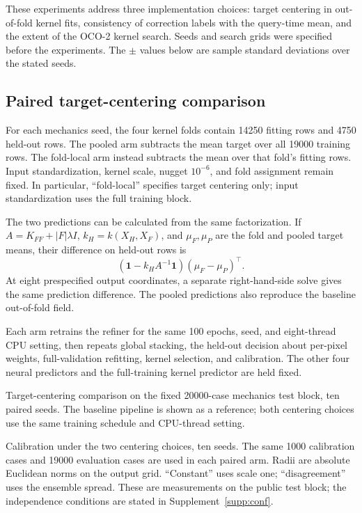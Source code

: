 These experiments address three implementation choices:
target centering in out-of-fold kernel fits,
consistency of correction labels with the query-time mean, and the extent
of the OCO-2 kernel search. Seeds and search grids were specified before the experiments. The $\pm$ values below
are sample standard deviations over the stated seeds.

\subsection{Paired target-centering comparison}
For each mechanics seed, the four kernel folds contain 14250 fitting rows
and 4750 held-out rows. The pooled arm subtracts the mean target over all
19000 training rows. The fold-local arm instead subtracts the mean over
that fold's fitting rows. Input standardization, kernel scale, nugget
$10^{-6}$, and fold assignment remain fixed. In particular, ``fold-local''
specifies target centering only; input standardization uses the full
training block.

The two predictions can be calculated from the same factorization. If
$A=K_{FF}+|F|\lambda I$, $k_H=k(X_H,X_F)$, and $\mu_F,\mu_P$ are the
fold and pooled target means, their difference on held-out rows is
\[
 (\mathbf 1-k_HA^{-1}\mathbf 1)(\mu_F-\mu_P)^\top.
\]
At eight prespecified output coordinates, a separate right-hand-side
solve gives the same prediction difference. The pooled predictions also
reproduce the baseline out-of-fold field.

Each arm retrains the refiner for the same 100 epochs, seed, and eight-thread
CPU setting, then repeats global stacking, the held-out decision about
per-pixel weights, full-validation refitting, kernel selection, and
calibration. The other four neural predictors and the full-training kernel
predictor are held fixed.

\begin{table}[t]
\centering
\caption{Target-centering comparison on the fixed 20000-case mechanics test
block, ten paired seeds. The baseline pipeline is shown as a reference;
both centering choices use the same training schedule and CPU-thread setting.}
\label{tab:centering-sensitivity}
\begin{adjustbox}{max width=\linewidth}

\end{adjustbox}
\end{table}

\begin{table}[t]
\centering
\caption{Calibration under the two centering choices, ten seeds. The same 1000
calibration cases and 19000 evaluation cases are used in each paired arm.
Radii are absolute Euclidean norms on the output grid. ``Constant'' uses scale one; ``disagreement'' uses the ensemble spread. These are measurements on the public test block; the independence conditions are stated in Supplement~\ref{supp:conf}.}
\label{tab:centering-uq}
\begin{adjustbox}{max width=\linewidth}

\end{adjustbox}
\end{table}

